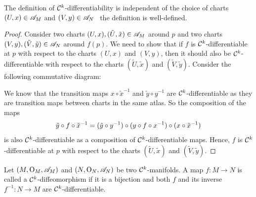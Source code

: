 \begin{proposition}
	The definition of \(\mathcal C^{k}\)-differentiability is independent of the choice of charts \((U, x) \in \mathscr{A}_M\) and \((V, y) \in \mathscr{A}_N\) \ie\ the definition is well-defined.
\end{proposition}
\begin{proof}
	Consider two charts \((U, x), (\tilde{U}, \tilde{x}) \in \mathscr{A}_M\) around \(p\) and two charts \((V, y), (\tilde{V}, \tilde{y}) \in \mathscr{A}_N\) around \(f(p)\). We need to show that if \(f\) is \(\mathcal C^{k}\)-differentiable at \(p\) with respect to the charts \((U, x)\) and \((V, y)\), then it should also be \(\mathcal C^{k}\)-differentiable with respect to the charts \((\tilde{U}, \tilde{x})\) and \((\tilde{V}, \tilde{y})\). Consider the following commutative diagram:
	\begin{figure}[H]
		\centering
	\end{figure}
	We know that the transition maps \(x \circ \tilde{x}^{-1}\) and \(\tilde{y} \circ y^{-1}\) are \(\mathcal C^{k}\)-differentiable as they are transition maps between charts in the same atlas. So the composition of the maps
	\begin{equation}
		\tilde{y} \circ f \circ \tilde{x}^{-1} = (\tilde{y} \circ y^{-1}) \circ (y \circ f \circ x^{-1}) \circ (x \circ \tilde{x}^{-1})
	\end{equation}
	is also \(\mathcal C^{k}\)-differentiable as a composition of \(\mathcal C^{k}\)-differentiable maps. Hence, \(f\) is \(\mathcal C^{k}\)-differentiable at \(p\) with respect to the charts \((\tilde{U}, \tilde{x})\) and \((\tilde{V}, \tilde{y})\).
\end{proof}

\begin{definition}[Diffeomorphism]
	Let \((M, \mathrm{O}_M, \mathscr{A}_M)\) and \((N, \mathrm{O}_N, \mathscr{A}_N)\) be two \(\mathcal C^{k}\)-manifolds. A map \(f: M \to N\) is called a \(\mathcal C^{k}\)-diffeomorphism if it is a bijection and both \(f\) and its inverse \(f^{-1}: N \to M\) are \(\mathcal C^{k}\)-differentiable.
\end{definition}

